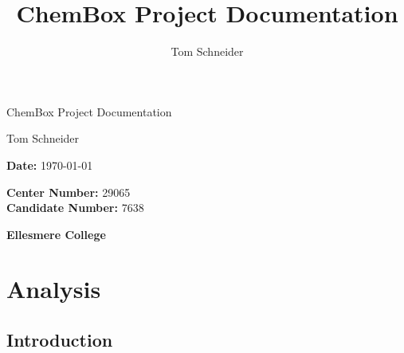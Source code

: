 \documentclass[a4paper,12pt]{article}
\title{ChemBox Project Documentation}
\author{Tom Schneider}
\begin{document}
\begin{titlepage}
    \begin{center}
        \vspace*{1cm}
        
        \huge ChemBox Project Documentation
        
        \vspace{1cm}
        
        \Large Tom Schneider
        
        \vfill
        
        \textbf{Date:} \today \\
        
        \vspace{1cm}
        
        \textbf{Center Number:} 29065 \\
        \textbf{Candidate Number:} 7638 \\
        
        \vspace{1cm}
        
        \textbf{Ellesmere College}
        
    \end{center}
\end{titlepage}

\tableofcontents

\pagebreak

\section{Analysis}

\subsection{Introduction}
\end{document}
